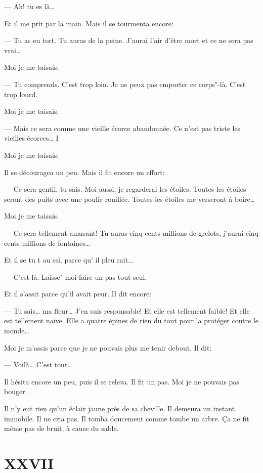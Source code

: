 --- Ah! tu es là\ldots{}

Et il me prit par la main. Mais il se tourmenta encore:

--- Tu as eu tort. Tu auras de la peine. J'aurai l'air d'être mort et ce ne
sera pas vrai\ldots{}

Moi je me taisais.

--- Tu comprends. C'est trop loin. Je ne peux pas emporter ce corps"-là. C'est
trop lourd.

Moi je me taisais.

--- Mais ce sera comme une vieille écorce abandonnée. Ce n'est pas triste les
vieilles écorces\ldots{} I

Moi je me taisais.

Il se découragea un peu. Mais il fit encore un effort:

--- Ce sera gentil, tu sais. Moi aussi, je regarderai les étoiles. Toutes les
étoiles seront des puits avec une poulie rouillée. Toutes les étoiles me
verseront à boire\ldots{}

Moi je me taisais.

--- Ce sera tellement amusant! Tu auras cinq cents millions de grelots, j'aurai
cinq cents millions de fontaines\ldots{}

Et il se tu t au ssi, parce qu’ il pleu rait...

\medskip

--- C'est là. Laisse"-moi faire un pas tout seul.

Et il s'assit parce qu'il avait peur. Il dit encore:

--- Tu sais\ldots{} ma fleur\ldots{} J'en suis responsable! Et elle est tellement
faible! Et elle est tellement naïve. Elle a quatre épines de rien du tout pour
la protéger contre le monde\ldots{}

Moi je m'assis parce que je ne pouvais plus me tenir debout. Il dit:

--- Voilà\ldots{} C'est tout\ldots{}

Il hésita encore un peu, puis il se releva. Il fit un pas. Moi je ne pouvais pas
bouger.

Il n'y eut rien qu’un éclair jaune près de sa cheville. Il demeura un instant
immobile. Il ne cria pas. Il tomba doucement comme tombe un arbre. Ça ne fit même
pas de bruit, à cause du sable.

\section{XXVII}

